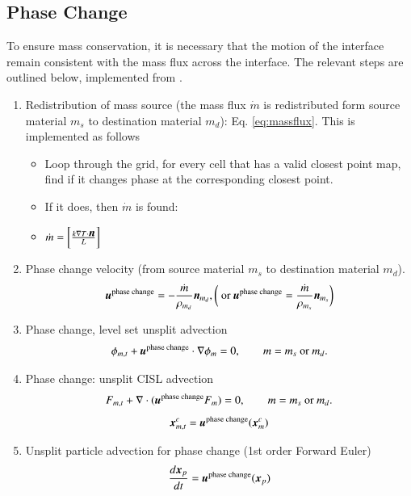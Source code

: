 \documentclass[preprint,12pt]{Definitions/elsarticle}
\newcommand{\tn}{\textnormal}
\newcommand{\bmu}{\mbox{\boldmath $u$\unboldmath}}
\newcommand{\bmx}{\mbox{\boldmath $x$\unboldmath}}
\newcommand{\bmn}{\mbox{\boldmath $n$\unboldmath}}
\begin{document}
\subsection{Phase Change} \label{Phase Change}
To ensure mass conservation, it is necessary that the motion of the interface remain consistent with the mass flux across the interface. The relevant steps are outlined below, implemented from \cite{VAHAB2021}.
\begin{enumerate}
	\item Redistribution of mass source (the mass flux $\dot{m}$ is redistributed form source material $m_{s}$ to destination material $m_d$): Eq. \ref{eq:massflux}. This is implemented as follows
	\begin{itemize}
		\item Loop through the grid, for every cell that has a valid closest point map, find if it changes phase at the corresponding closest point. 
		\item If it does, then $\dot{m}$ is found:
		\item $\dot{m} = \bigg[\frac{k\nabla T\cdot \bmn}{L}\bigg]$ 
	\end{itemize}
	
	\item Phase change velocity (from source material $m_{s}$ to destination material $m_{d}$).
	\begin{equation}
	\bmu^{\tn{phase change}}=-\frac{\dot{m}}{\rho_{m_{d}}}\bmn_{m_{d}}, \bigg(\tn{ or } \bmu^{\tn{phase change}}=\frac{\dot{m}}{\rho_{m_{s}}}\bmn_{m_{s}}\bigg)
	\label{uphasechange}
	\end{equation}
	\item Phase change, level set unsplit advection
	\begin{equation}
	\phi_{m,t}+\bmu^{\tn{phase change}}\cdot\nabla\phi_{m}=0,
	\qquad m=m_{s} \mbox{ or } m_{d}.
	\end{equation}
	\item Phase change: unsplit CISL advection
	\begin{equation}
	F_{m,t}+\nabla\cdot(\bmu^{\tn{phase change}}F_{m})=0,
	\qquad m=m_{s} \mbox{ or } m_{d}.
	\end{equation}
	\begin{equation}
	\bmx_{m,t}^c=\bmu^\tn{phase change}(\bmx_{m}^c)
	\end{equation}
	
	\item Unsplit particle advection for phase change (1st order Forward Euler)
	\begin{equation}
	\frac{d\bmx_{p}}{dt}=\bmu^\tn{phase change}(\bmx_{p})
	\end{equation}
	

\end{enumerate}
\end{document}
